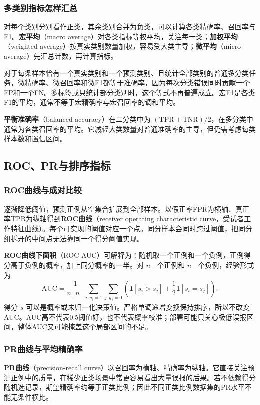 \documentclass[UTF8,fontset=none,zihao=-4,a4paper]{ctexart}
\newcommand{\term}[1]{\textbf{#1}}
\numberwithin{equation}{section}
\numberwithin{figure}{section}
\begin{document}
\subsubsection{多类别指标怎样汇总}
对每个类别分别看作正类，其余类别合并为负类，可以计算各类精确率、召回率与F1。\term{宏平均}（macro average）对各类指标等权平均，关注每一类；\term{加权平均}（weighted average）按真实类别数量加权，容易受大类主导；\term{微平均}（micro average）先汇总计数，再计算指标。

对于每条样本恰有一个真实类别和一个预测类别、且统计全部类别的普通多分类任务，微精确率、微召回率和微F1都等于准确率，因为每次分类错误同时贡献一个FP和一个FN。多标签或只统计部分类别时，这个等式不再普遍成立。宏F1是各类F1的平均，通常不等于宏精确率与宏召回率的调和平均。

\term{平衡准确率}（balanced accuracy）在二分类中为 $(\mathrm{TPR}+\mathrm{TNR})/2$，在多分类中通常为各类召回率的平均。它减轻大类数量对普通准确率的主导，但仍需考虑每类样本数和置信区间。

\subsection{ROC、PR与排序指标}
\subsubsection{ROC曲线与成对比较}
逐渐降低阈值，预测正例从空集合扩展到全部样本。以假正率FPR为横轴、真正率TPR为纵轴得到\term{ROC曲线}（receiver operating characteristic curve，受试者工作特征曲线）。每个可实现的阈值对应一个点。同分样本会同时跨过阈值，把同分组拆开的中间点无法靠同一个得分阈值实现。

\term{ROC曲线下面积}（ROC AUC）可解释为：随机取一个正例和一个负例，正例得分高于负例的概率，加上同分概率的一半。对 $n_+$ 个正例和 $n_-$ 个负例，经验形式为
\[
 \mathrm{AUC}=\frac1{n_+n_-}\sum_{i:y_i=1}\sum_{j:y_j=0}
 \left(\mathbf1[s_i>s_j]+\frac12\mathbf1[s_i=s_j]\right).
\]
得分 $s$ 可以是概率或未归一化决策值。严格单调递增变换保持排序，所以不改变AUC。AUC高不代表0.5阈值好，也不代表概率校准；部署可能只关心极低误报区间，整体AUC又可能掩盖这个局部区间的不足。

\subsubsection{PR曲线与平均精确率}
\term{PR曲线}（precision-recall curve）以召回率为横轴、精确率为纵轴。它直接关注预测正例中的质量，在稀少正类场景中常更容易看出大量误报的后果。若不依赖得分随机选记录，期望精确率约等于正类比例；因此不同正类比例数据集的PR水平不能无条件横比。
\end{document}
